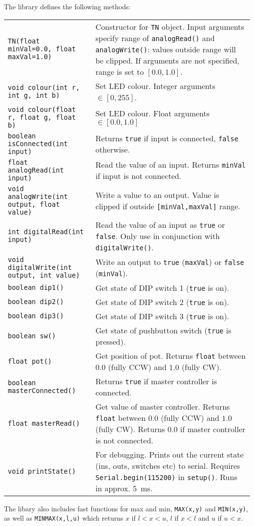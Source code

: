 \documentclass[a4paper,10pt]{article}
\begin{document}
The library defines the following methods:
\begin{table}[h!]
\begin{tabular}{l p{9cm} }
\verb+TN(float minVal=0.0, float maxVal=1.0)+ & Constructor for \verb|TN| object.  Input arguments specify range of \verb|analogRead()| and \verb|analogWrite()|: values outside range will be clipped.  If arguments are not specified, range is set to $[0.0,1.0]$.\\
\verb+void colour(int r, int g, int b)+ & Set LED colour.  Integer arguments $\in [0,255]$.  \\
\verb+void colour(float r, float g, float b)+ & Set LED colour.  Float arguments $\in [0.0,1.0]$ \\
\verb+boolean isConnected(int input)+ & Returns \verb|true| if input is connected, \verb|false| otherwise.\\
\verb+float analogRead(int input)+ & Read the value of an input.  Returns \verb|minVal| if input is not connected.\\
\verb+void analogWrite(int output, float value)+ & Write a value to an output.  Value is clipped if outside \verb|[minVal,maxVal]| range.\\
\verb+int digitalRead(int input)+ & Read the value of an input as \verb|true| or \verb|false|.  Only use in conjunction with \verb|digitalWrite()|.\\
\verb+void digitalWrite(int output, int value)+ & Write an output to \verb|true| (\verb|maxVal|) or \verb|false| (\verb|minVal|). \\
\verb+boolean dip1()+ & Get state of DIP switch 1 (\verb|true| is on).\\
\verb+boolean dip2()+ & Get state of DIP switch 2 (\verb|true| is on).\\
\verb+boolean dip3()+ & Get state of DIP switch 3 (\verb|true| is on).\\
\verb+boolean sw()+ & Get state of pushbutton switch (\verb|true| is pressed).\\
\verb+float pot()+ & Get position of pot.  Returns \verb|float| between $0.0$ (fully CCW) and $1.0$ (fully CW).\\
\verb+boolean masterConnected()+ & Returns \verb|true| if master controller is connected.  \\
\verb+float masterRead()+ & Get value of master controller.  Returns \verb|float| between $0.0$ (fully CCW) and $1.0$ (fully CW).  Returns $0.0$ if master controller is not connected. \\
\verb+void printState()+ & For debugging.  Prints out the current state (ins, outs, switches etc) to serial.  Requires \verb|Serial.begin(115200)| in \verb|setup()|.  Runs in approx. 5~ms.
\end{tabular}
\end{table}

The libary also includes fast functions for max and min, \verb|MAX(x,y)| and \verb|MIN(x,y)|, as well as \verb|MINMAX(x,l,u)| which returns $x$ if $l<x<u$, $l$ if $x < l$ and $u$ if $u<x$.
\end{document}
